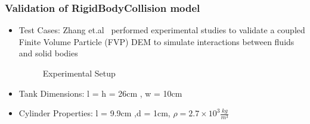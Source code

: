 \documentclass{beamer}
\begin{document}
  \begin{frame} %
  \frametitle{Validation of RigidBodyCollision model}
  	\begin{itemize}
  	 \item Test Cases: Zhang et.al\footnotemark ~ performed experimental studies to validate a coupled Finite Volume Particle (FVP) DEM to simulate interactions between fluids and solid bodies 
 	   \begin{figure}
 	   \caption{Experimental Setup}
 	   \end{figure}
 	   \item Tank Dimensions: l = h = 26cm , w = 10cm
 	   \item Cylinder Properties: l = 9.9cm ,d = 1cm, $\rho =2.7 \times 10^{3} \frac{kg}{m^3} $
    \end{itemize}
    
  \end{frame}
  
\end{document}
